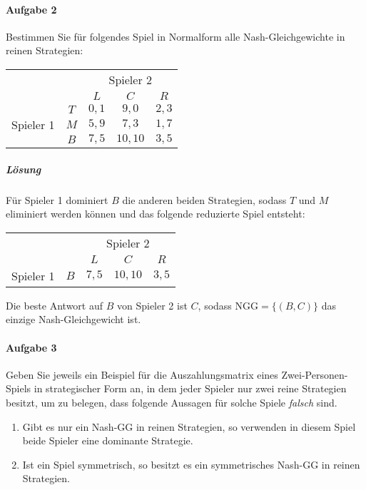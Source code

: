 \paragraph{Aufgabe 2}%
\label{par:serie_3_aufgabe_2}

Bestimmen Sie für folgendes Spiel in Normalform alle Nash-Gleichgewichte in reinen
Strategien:

\begin{center}
  \begin{tabular}{ccccc}
    & & \multicolumn{3}{c}{Spieler 2}\\
    & & $L$ & $C$ & $R$\\
    \cmidrule{3-5}
    \multirow{3}{*}{Spieler 1}
    & $T$ & $0,1$ & $9,0$ & $2,3$\\
    \cmidrule{3-5}
    & $M$ & $5,9$ & $7,3$ & $1,7$\\
    \cmidrule{3-5}
    & $B$ & $7,5$ & $10,10$ & $3,5$\\
    \cmidrule{3-5}
  \end{tabular}
\end{center}

\subparagraph{Lösung}%

Für Spieler 1 dominiert $B$ die anderen beiden Strategien, sodass $T$ und $M$ eliminiert
werden können und das folgende reduzierte Spiel entsteht:
\begin{center}
  \begin{tabular}{ccccc}
    & & \multicolumn{3}{c}{Spieler 2}\\
    & & $L$ & $C$ & $R$\\
    \cmidrule{3-5}
    Spieler 1 & $B$ & $7,5$ & $10,10$ & $3,5$\\
    \cmidrule{3-5}
  \end{tabular}
\end{center}

Die beste Antwort auf $B$ von Spieler 2 ist $C$, sodass $\text{NGG} = \{(B,C)\}$ das
einzige Nash-Gleichgewicht ist.

\paragraph{Aufgabe 3}%
\label{par:serie_3_aufgabe_3}

Geben Sie jeweils ein Beispiel für die Auszahlungsmatrix eines Zwei-Personen-Spiels in
strategischer Form an, in dem jeder Spieler nur zwei reine Strategien besitzt, um zu
belegen, dass folgende Aussagen für solche Spiele \emph{falsch} sind.

\begin{enumerate}
  \item Gibt es nur ein Nash-GG in reinen Strategien, so verwenden in diesem Spiel beide
    Spieler eine dominante Strategie.
  \item Ist ein Spiel symmetrisch, so besitzt es ein symmetrisches Nash-GG in reinen
    Strategien.
\end{enumerate}

